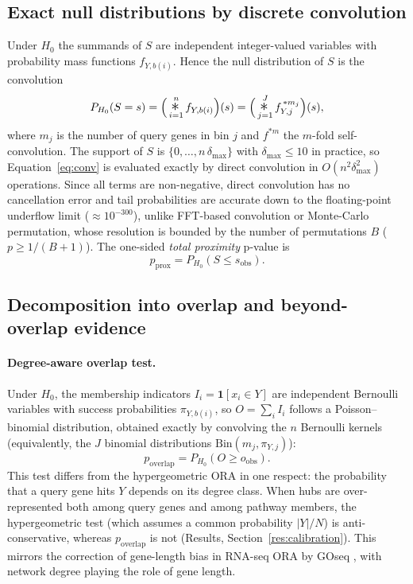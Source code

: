 \subsection{Exact null distributions by discrete convolution}
Under $H_0$ the summands of $S$ are independent integer-valued variables with probability mass functions $f_{Y, b(i)}$. Hence the null distribution of $S$ is the convolution
\begin{equation}
P_{H_0}(S = s) = \Big(\mathop{\scalebox{1.5}{$\ast$}}_{i=1}^{n} f_{Y,b(i)}\Big)(s) = \Big(\mathop{\scalebox{1.5}{$\ast$}}_{j=1}^{J} f_{Y,j}^{\,\ast m_j}\Big)(s),
\label{eq:conv}
\end{equation}
where $m_j$ is the number of query genes in bin $j$ and $f^{\ast m}$ the $m$-fold self-convolution. The support of $S$ is $\{0, \dots, n\,\delta_{\max}\}$ with $\delta_{\max} \le 10$ in practice, so Equation~\eqref{eq:conv} is evaluated exactly by direct convolution in $O(n^2 \delta_{\max}^2)$ operations. Since all terms are non-negative, direct convolution has no cancellation error and tail probabilities are accurate down to the floating-point underflow limit ($\approx 10^{-300}$), unlike FFT-based convolution or Monte-Carlo permutation, whose resolution is bounded by the number of permutations $B$ ($p \ge 1/(B+1)$). The one-sided \emph{total proximity} p-value is
\begin{equation}
p_{\mathrm{prox}} = P_{H_0}(S \le s_{\mathrm{obs}}).
\end{equation}

\subsection{Decomposition into overlap and beyond-overlap evidence}
\paragraph{Degree-aware overlap test.} Under $H_0$, the membership indicators $I_i = \mathbf{1}[x_i \in Y]$ are independent Bernoulli variables with success probabilities $\pi_{Y, b(i)}$, so $O = \sum_i I_i$ follows a Poisson--binomial distribution, obtained exactly by convolving the $n$ Bernoulli kernels (equivalently, the $J$ binomial distributions $\mathrm{Bin}(m_j, \pi_{Y,j})$):
\begin{equation}
p_{\mathrm{overlap}} = P_{H_0}(O \ge o_{\mathrm{obs}}).
\end{equation}
This test differs from the hypergeometric ORA in one respect: the probability that a query gene hits $Y$ depends on its degree class. When hubs are over-represented both among query genes and among pathway members, the hypergeometric test (which assumes a common probability $|Y|/N$) is anti-conservative, whereas $p_{\mathrm{overlap}}$ is not (Results, Section~\ref{res:calibration}). This mirrors the correction of gene-length bias in RNA-seq ORA by GOseq \citep{Young2010}, with network degree playing the role of gene length.

